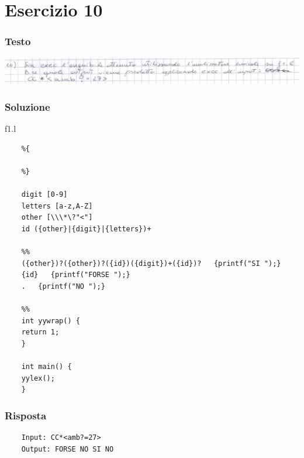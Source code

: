 \chapter{Esercizio 10}

\subsection{Testo}

\begin{center}
    \includegraphics[scale=0.2]{Chapters/Img/10text.png}\\
\end{center} 

\subsection{Soluzione}
f1.l
\begin{lstlisting}
    %{
    
    %}

    digit [0-9]
    letters [a-z,A-Z]
    other [\\\*\?"<"]
    id ({other}|{digit}|{letters})+

    %%
    ({other})?({other})?({id})({digit})+({id})?   {printf("SI ");}
    {id}   {printf("FORSE ");}
    .   {printf("NO ");}

    %%
    int yywrap() {
    return 1;
    }

    int main() {
    yylex();
    }
\end{lstlisting}

\subsection{Risposta}
\begin{lstlisting}
    Input: CC*<amb?=27> 
    Output: FORSE NO SI NO
\end{lstlisting}